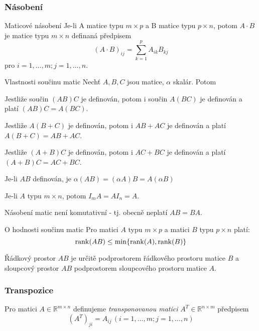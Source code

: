 \subsubsection*{Násobení}

\begin{definiceN}{Maticové násobení}
Je-li A matice typu $m \times p$ a B matice typu $p \times n$, potom $A\cdot B$ je matice typu $m \times n$ definaná předpisem $$(A\cdot B)_{ij} = \sum_{k=1}^p A_{ik} B_{kj}$$ pro $i=1,\dots,m; j=1,\dots,n$.
\end{definiceN}


\begin{lemmaN}{Vlastnosti součinu matic}
Nechť $A,B,C$ jsou matice, $\alpha$ skalár. Potom
\begin{penumerate}
	\item Jestliže součin $(AB)C$ je definován, potom i součin $A(BC)$ je definován a platí $(AB)C=A(BC)$.
	\item Jestliže $A(B+C)$ je definován, potom i $AB+AC$ je definován a platí $A(B+C)=AB+AC$.
	\item Jestliže $(A+B)C$ je definován, potom i $AC+BC$ je definován a platí $(A+B)C=AC+BC$.
	\item Je-li $AB$ definován, je $\alpha (AB)=(\alpha A)B=A(\alpha B)$
	\item Je-li $A$ typu $m \times n$, potom $I_m A=A I_n =A$.
\end{penumerate}

\noindent Násobení matic není komutativní - tj. obecně neplatí $AB=BA$.
\end{lemmaN}

\begin{vetaN}{O hodnosti součinu matic}
Pro matici $A$ typu $m\times p$ a matici $B$ typu $p\times n$ platí:
$$\mathrm{rank}(AB)\leq \min\{\mathrm{rank}(A),\mathrm{rank}(B)\}$$

\begin{dukaz}
Řádkový prostor $AB$ je určitě podprostorem řádkového prostoru matice $B$ a sloupcový prostor $AB$ podprostorem sloupcového prostoru matice $A$.
\end{dukaz}
\end{vetaN}


\subsubsection*{Transpozice}


\begin{definice}
Pro matici $A \in \mathbb{R}^{m \times n}$ definujeme \emph{transponovanou matici} $A^T \in \mathbb{R}^{n \times m}$ předpisem $$(A^T)_{ji} = A_{ij} \, (i=1, \dots, m; j=1, \dots, n)$$
\end{definice}

